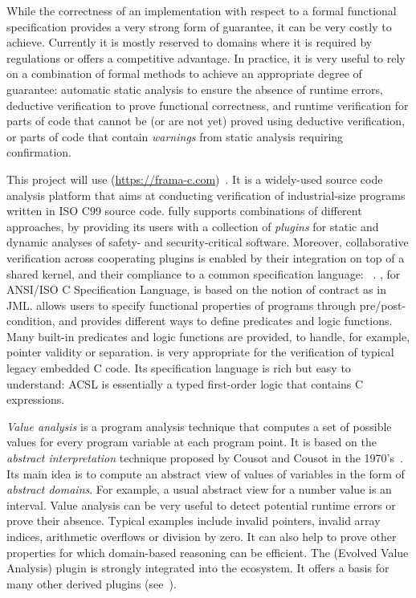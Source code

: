 While the correctness of an implementation with respect to a formal functional specification provides a very strong form of guarantee, it can be very costly to achieve.
Currently it is mostly reserved to domains where it is required by regulations or offers a competitive advantage.
In practice, it is very useful to rely on a combination of formal methods to achieve an appropriate degree of guarantee:
automatic static analysis to ensure the absence of runtime errors,
deductive verification to prove functional correctness,
and runtime verification for parts of code that cannot be (or are not yet) proved using deductive verification,
or parts of code that contain \emph{warnings} from static analysis requiring confirmation.

This project will use \framac{} (\url{https://frama-c.com})~\cite{KKP2015:FAC}.
It is a widely-used source code analysis platform that aims at conducting verification of industrial-size programs written in ISO C99 source code.
\framac{} fully supports combinations of different approaches, by providing its users with a collection of \emph{plugins} for static and dynamic analyses of safety- and security-critical software.
Moreover, collaborative verification across cooperating plugins is enabled by their integration on top of a shared kernel, and their compliance to a common specification language: \acsl~\cite{ACSL}.
\acsl, for ANSI/ISO C Specification Language, is based on the notion of contract as in JML.
\acsl allows users to specify functional properties of programs through pre/post-condition, and provides different ways to define predicates and logic functions.
Many built-in predicates and logic functions are provided, to handle, for example, pointer validity or separation.
\framac is very appropriate for the verification of typical legacy embedded C code.
Its specification language is rich but easy to understand: ACSL is essentially a typed first-order logic that contains C expressions.

\emph{Value analysis} is a program analysis technique that computes a set of possible values for every program variable at each program point.
It is based on the \emph{abstract interpretation} technique proposed by Cousot and Cousot in the 1970's~\cite{cousot77}.
Its main idea is to compute an abstract view of values of variables in the form of \emph{abstract domains}.
For example, a usual abstract view for a number value is an interval.
Value analysis can be very useful to detect potential runtime errors or prove their absence.
Typical examples include invalid pointers, invalid array indices, arithmetic overflows or division by zero.
It can also help to prove other properties for which domain-based reasoning can be efficient.
The \Eva (Evolved Value Analysis) plugin is strongly integrated into the \framac ecosystem.
It offers a basis for many other derived plugins (see~\cite{KKP2015:FAC}).

